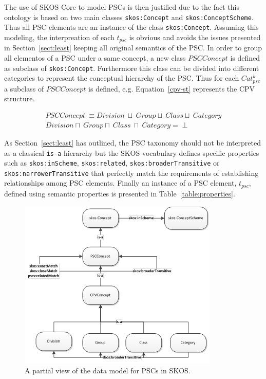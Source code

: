 \begin{itemize}
 The use of SKOS Core to model PSCs is then justified due to the fact this ontology is based on two 
 main classes \texttt{skos:Concept} and \texttt{skos:ConceptScheme}. Thus all PSC elements are 
 an instance of the class \texttt{skos:Concept}. Assuming this modeling, the interpreation of each $t_{psc}$ 
 is obvious and avoids the issues presented in Section~\ref{sect:least} keeping all original semantics of the PSC. In order 
 to group all elementos of a PSC under a same concept, a new class $PSCConcept$ is defined as subclass of 
 \texttt{skos:Concept}. Furthermore this class can be divided into different categories to represent 
 the conceptual hierarchy of the PSC. Thus for each $Cat_{psc}^k$ a subclass of $PSCConcept$ is defined, e.g. 
 Equation~\ref{cpv-st} represents the CPV structure.
 
 \begin{equation}\label{cpv-st}
 \begin{split}
 PSCConcept\ \equiv Division\ \sqcup\ Group \sqcup\ Class \sqcup\ Category \\
 Division \sqcap\ Group \sqcap\ Class\ \sqcap\ Category = \perp
 \end{split}
\end{equation}

  As Section~\ref{sect:least} has outlined, the PSC taxonomy should not be interpreted as a classical \texttt{is-a} hierarchy but 
  the SKOS vocabulary defines specific properties such as \texttt{skos:inScheme}, \texttt{skos:related}, \texttt{skos:broaderTransitive} or
  \texttt{skos:narrowerTransitive} that perfectly match the requirements of establishing relationships among PSC elements. Finally an 
  instance of a PSC element, $t_{psc}$, defined using semantic properties is presented in Table~\ref{table:properties}. 
  
 \begin{figure}[!ht]
\centering
	\includegraphics[width=\textwidth]{./imgs/fig-2}
 \caption{A partial view of the data model for PSCs in SKOS.}
 \label{fig:pscs-data-model}
\end{figure}


\end{itemize}
